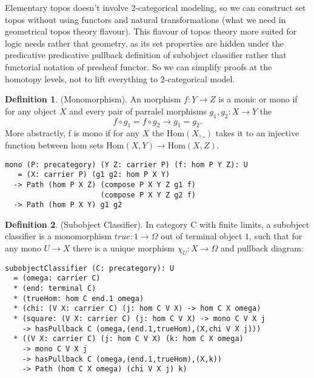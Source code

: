 \documentclass{article}
\theoremstyle{definition}
\newtheorem{definition}{Definition}
\begin{document}
Elementary topos doesn't involve 2-categorical modeling, so we can construct
set topos without using functors and natural transformations
(what we need in geometrical topos theory flavour). This flavour of topos
theory more suited for logic needs rather that geometry, as its set properties
are hidden under the predicative predicative pullback definition of subobject classifier
rather that functorial notation of presheaf functor. So we can simplify proofs
at the homotopy levels, not to lift everything to 2-categorical model.

\begin{definition} (Monomorphism).
An morphism $f : Y \rightarrow Z $ is a monic or mono
if for any object $X$ and every pair of parralel morphisms $g_1,g_2: X \rightarrow Y$ the
$$
    f \circ g_1 = f \circ g_2 \rightarrow g_1 = g_2.
$$
More abstractly, f is mono if for any $X$ the $\mathrm{Hom}(X,\_)$ takes it to an injective
function between hom sets $\mathrm{Hom}(X,Y) \rightarrow \mathrm{Hom}(X,Z)$.
\begin{lstlisting}
mono (P: precategory) (Y Z: carrier P) (f: hom P Y Z): U
   = (X: carrier P) (g1 g2: hom P X Y)
  -> Path (hom P X Z) (compose P X Y Z g1 f)
                      (compose P X Y Z g2 f)
  -> Path (hom P X Y) g1 g2
\end{lstlisting}
\end{definition}

\begin{definition} (Subobject Classifier\cite{Johnstone14}).
In category $\mathrm{C}$ with finite limits,
a subobject classifier is a monomorphism $true: 1 \rightarrow \Omega$ out of terminal
object $\mathrm{1}$, such that for any mono $U \rightarrow X$ there is a unique
morphism $\chi_U : X \rightarrow \Omega$ and pullback diagram:
\begin{lstlisting}
subobjectClassifier (C: precategory): U
  = (omega: carrier C)
  * (end: terminal C)
  * (trueHom: hom C end.1 omega)
  * (chi: (V X: carrier C) (j: hom C V X) -> hom C X omega)
  * (square: (V X: carrier C) (j: hom C V X) -> mono C V X j
    -> hasPullback C (omega,(end.1,trueHom),(X,chi V X j)))
  * ((V X: carrier C) (j: hom C V X) (k: hom C X omega)
    -> mono C V X j
    -> hasPullback C (omega,(end.1,trueHom),(X,k))
    -> Path (hom C X omega) (chi V X j) k)
\end{lstlisting}
\end{definition}
\end{document}
